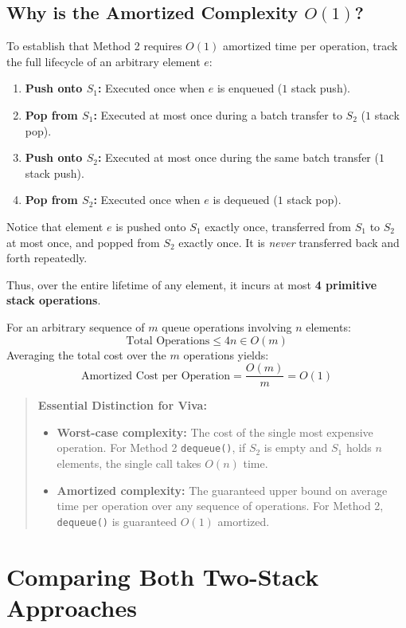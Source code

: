 \subsection{Why is the Amortized Complexity $O(1)$?}

To establish that Method 2 requires $O(1)$ amortized time per operation, track the full lifecycle of an arbitrary element $e$:
\begin{enumerate}
    \item \textbf{Push onto $S_1$:} Executed once when $e$ is enqueued ($1$ stack push).
    \item \textbf{Pop from $S_1$:} Executed at most once during a batch transfer to $S_2$ ($1$ stack pop).
    \item \textbf{Push onto $S_2$:} Executed at most once during the same batch transfer ($1$ stack push).
    \item \textbf{Pop from $S_2$:} Executed once when $e$ is dequeued ($1$ stack pop).
\end{enumerate}

Notice that element $e$ is pushed onto $S_1$ exactly once, transferred from $S_1$ to $S_2$ at most once, and popped from $S_2$ exactly once. It is \emph{never} transferred back and forth repeatedly.

Thus, over the entire lifetime of any element, it incurs at most \textbf{4 primitive stack operations}.

For an arbitrary sequence of $m$ queue operations involving $n$ elements:
\[
\text{Total Operations} \leq 4n \in O(m)
\]
Averaging the total cost over the $m$ operations yields:
\[
\text{Amortized Cost per Operation} = \frac{O(m)}{m} = O(1)
\]

\begin{quote}
\textbf{Essential Distinction for Viva:}
\begin{itemize}
    \item \textbf{Worst-case complexity:} The cost of the single most expensive operation. For Method 2 \texttt{dequeue()}, if $S_2$ is empty and $S_1$ holds $n$ elements, the single call takes $O(n)$ time.
    \item \textbf{Amortized complexity:} The guaranteed upper bound on average time per operation over any sequence of operations. For Method 2, \texttt{dequeue()} is guaranteed $O(1)$ amortized.
\end{itemize}
\end{quote}

\section{Comparing Both Two-Stack Approaches}


